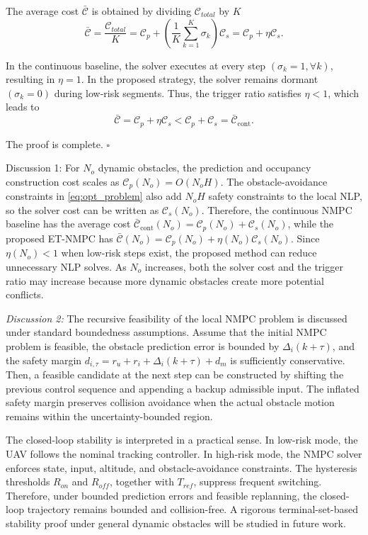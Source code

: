 \documentclass[lettersize,journal]{IEEEtran}
\begin{document}
The average cost $\bar{\mathcal{C}}$ is obtained by dividing $\mathcal{C}_{total}$ by $K$
\begin{equation}
	\bar{\mathcal{C}} = \frac{\mathcal{C}_{total}}{K} = \mathcal{C}_{p} + \left( \frac{1}{K} \sum_{k=1}^{K} \sigma_k \right) \mathcal{C}_{s} = \mathcal{C}_{p} + \eta \mathcal{C}_{s}.
\end{equation}

In the continuous baseline, the solver executes at every step $(\sigma_k = 1, \forall k)$, resulting in $\eta = 1$. In the proposed strategy, the solver remains dormant $(\sigma_k = 0)$ during low-risk segments. Thus, the trigger ratio satisfies $\eta < 1$, which leads to
\begin{equation}
	\bar{\mathcal{C}} = \mathcal{C}_{p} + \eta \mathcal{C}_{s} < \mathcal{C}_{p} + \mathcal{C}_{s} = \bar{\mathcal{C}}_{\mathrm{cont}}.
\end{equation}

The proof is complete. \hfill $\square$

{Discussion 1:}
	For $N_o$ dynamic obstacles, the prediction and occupancy construction cost scales as $\mathcal{C}_{p}(N_o)=O(N_oH)$. The obstacle-avoidance constraints in \eqref{eq:opt_problem} also add $N_oH$ safety constraints to the local NLP, so the solver cost can be written as $\mathcal{C}_{s}(N_o)$. Therefore, the continuous NMPC baseline has the average cost $\bar{\mathcal{C}}_{\mathrm{cont}}(N_o)=\mathcal{C}_{p}(N_o)+\mathcal{C}_{s}(N_o)$, while the proposed ET-NMPC has $\bar{\mathcal{C}}(N_o)=\mathcal{C}_{p}(N_o)+\eta(N_o)\mathcal{C}_{s}(N_o)$. Since $\eta(N_o)<1$ when low-risk steps exist, the proposed method can reduce unnecessary NLP solves. As $N_o$ increases, both the solver cost and the trigger ratio may increase because more dynamic obstacles create more potential conflicts.

\textit{Discussion 2:}
	The recursive feasibility of the local NMPC problem is discussed under standard boundedness assumptions. Assume that the initial NMPC problem is feasible, the obstacle prediction error is bounded by $\Delta_i(k+\tau)$, and the safety margin $d_{i,\tau}=r_u+r_i+\Delta_i(k+\tau)+d_m$ is sufficiently conservative. Then, a feasible candidate at the next step can be constructed by shifting the previous control sequence and appending a backup admissible input. The inflated safety margin preserves collision avoidance when the actual obstacle motion remains within the uncertainty-bounded region.

The closed-loop stability is interpreted in a practical sense. In low-risk mode, the UAV follows the nominal tracking controller. In high-risk mode, the NMPC solver enforces state, input, altitude, and obstacle-avoidance constraints. The hysteresis thresholds $R_{on}$ and $R_{off}$, together with $T_{ref}$, suppress frequent switching. Therefore, under bounded prediction errors and feasible replanning, the closed-loop trajectory remains bounded and collision-free. A rigorous terminal-set-based stability proof under general dynamic obstacles will be studied in future work.
\end{document}
